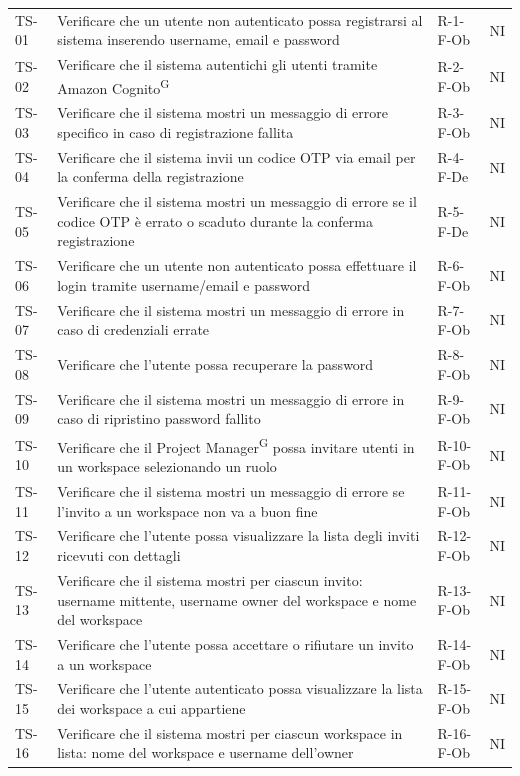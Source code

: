\documentclass[a4paper, 11pt]{article}
\begin{document}
\begin{longtable}{>{\centering\arraybackslash}m{1.2cm} >{\raggedright\arraybackslash}p{8.2cm} >{\centering\arraybackslash}m{2.5cm} >{\centering\arraybackslash}m{1.2cm}}
TS-01 & Verificare che un utente non autenticato possa registrarsi al sistema inserendo username, email e password & R-1-F-Ob & NI \\
TS-02 & Verificare che il sistema autentichi gli utenti tramite Amazon Cognito\textsuperscript{G} & R-2-F-Ob & NI \\
TS-03 & Verificare che il sistema mostri un messaggio di errore specifico in caso di registrazione fallita & R-3-F-Ob & NI \\
TS-04 & Verificare che il sistema invii un codice OTP via email per la conferma della registrazione & R-4-F-De & NI \\
TS-05 & Verificare che il sistema mostri un messaggio di errore se il codice OTP è errato o scaduto durante la conferma registrazione & R-5-F-De & NI \\
TS-06 & Verificare che un utente non autenticato possa effettuare il login tramite username/email e password & R-6-F-Ob & NI \\
TS-07 & Verificare che il sistema mostri un messaggio di errore in caso di credenziali errate & R-7-F-Ob & NI \\
TS-08 & Verificare che l'utente possa recuperare la password & R-8-F-Ob & NI \\
TS-09 & Verificare che il sistema mostri un messaggio di errore in caso di ripristino password fallito & R-9-F-Ob & NI \\
TS-10 & Verificare che il Project Manager\textsuperscript{G} possa invitare utenti in un workspace selezionando un ruolo & R-10-F-Ob & NI \\
TS-11 & Verificare che il sistema mostri un messaggio di errore se l'invito a un workspace non va a buon fine & R-11-F-Ob & NI \\
TS-12 & Verificare che l'utente possa visualizzare la lista degli inviti ricevuti con dettagli & R-12-F-Ob & NI \\
TS-13 & Verificare che il sistema mostri per ciascun invito: username mittente, username owner del workspace e nome del workspace & R-13-F-Ob & NI \\
TS-14 & Verificare che l'utente possa accettare o rifiutare un invito a un workspace & R-14-F-Ob & NI \\
TS-15 & Verificare che l'utente autenticato possa visualizzare la lista dei workspace a cui appartiene & R-15-F-Ob & NI \\
TS-16 & Verificare che il sistema mostri per ciascun workspace in lista: nome del workspace e username dell'owner & R-16-F-Ob & NI \\

\end{longtable}
\end{document}
